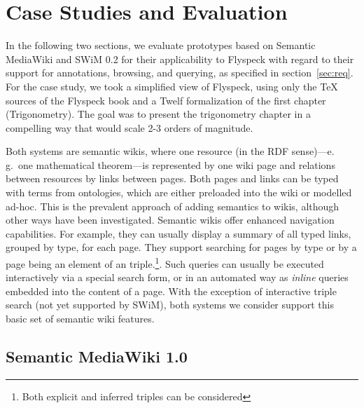 
\section{Case Studies and Evaluation}

In the following two sections, we evaluate prototypes based on Semantic
MediaWiki and SWiM 0.2 for their applicability to Flyspeck with regard to their
support for annotations, browsing, and querying, as specified in
section~\ref{sec:req}.  For the case study, we took a simplified 
view of Flyspeck, using only the {\TeX} sources of the
Flyspeck book and a Twelf formalization of the first chapter (Trigonometry).
The goal was to present the trigonometry chapter in a compelling way
that would scale 2-3 orders of magnitude.  

Both systems are semantic wikis, where one resource (in the RDF
sense)---e.\,g.\ one mathematical theorem---is represented by one wiki
page and relations between resources by links between pages.  Both
pages and links can be typed with terms from
ontologies\cite{OrDeMoVoHa06:annotation-navigation-semwiki}, which are
either preloaded into the wiki or modelled
ad-hoc\cite{KrSchVr:semwiki-reasoning07}.  This is the prevalent
approach of adding semantics to wikis, although other ways have been
investigated\cite{semwiki06}.  Semantic wikis offer enhanced
navigation capabilities.   For example, they can usually display
a summary of all typed links, grouped by type, for each page.  They support
searching for pages by type or by a page being an element of an
triple.\footnote{Both explicit and inferred triples can be considered\cite{KrSchVr:semwiki-reasoning07}}.  Such queries can
usually be executed interactively via a special search form, or in an
automated way as \emph{inline} queries 
embedded into the content of a
page.  With the exception of interactive triple search (not yet
supported by SWiM), both systems we consider support this basic set of semantic
wiki features.

\subsection{Semantic MediaWiki 1.0}
\label{sec:smw-study}

